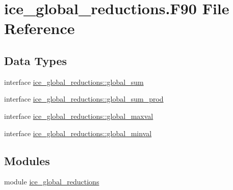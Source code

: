 \hypertarget{ice__global__reductions_8F90}{
\section{ice\_\-global\_\-reductions.F90 File Reference}
\label{ice__global__reductions_8F90}
}
\subsection*{Data Types}
\begin{DoxyCompactItemize}
\item 
interface \hyperlink{interfaceice__global__reductions_1_1global__sum}{ice\_\-global\_\-reductions::global\_\-sum}
\item 
interface \hyperlink{interfaceice__global__reductions_1_1global__sum__prod}{ice\_\-global\_\-reductions::global\_\-sum\_\-prod}
\item 
interface \hyperlink{interfaceice__global__reductions_1_1global__maxval}{ice\_\-global\_\-reductions::global\_\-maxval}
\item 
interface \hyperlink{interfaceice__global__reductions_1_1global__minval}{ice\_\-global\_\-reductions::global\_\-minval}
\end{DoxyCompactItemize}
\subsection*{Modules}
\begin{DoxyCompactItemize}
\item 
module \hyperlink{namespaceice__global__reductions}{ice\_\-global\_\-reductions}
\end{DoxyCompactItemize}
